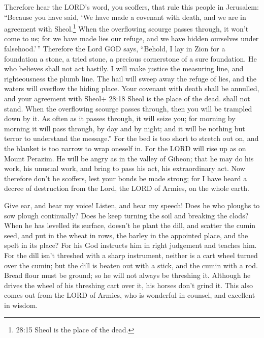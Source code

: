  Therefore hear the LORD's word, you scoffers, that rule
this people in Jerusalem:  ``Because you have said, `We
have made a covenant with death, and we are in agreement with
Sheol.\footnote{28:15 Sheol is the place of the dead.} When the
overflowing scourge passes through, it won't come to us; for we have
made lies our refuge, and we have hidden ourselves under falsehood.'\,''
 Therefore the Lord GOD says, ``Behold, I lay in Zion for a
foundation a stone, a tried stone, a precious cornerstone of a sure
foundation. He who believes shall not act hastily.  I will
make justice the measuring line, and righteousness the plumb line. The
hail will sweep away the refuge of lies, and the waters will overflow
the hiding place.  Your covenant with death shall be
annulled, and your agreement with Sheol+ 28:18 Sheol is the place of the
dead. shall not stand. When the overflowing scourge passes through, then
you will be trampled down by it.  As often as it passes
through, it will seize you; for morning by morning it will pass through,
by day and by night; and it will be nothing but terror to understand the
message.''  For the bed is too short to stretch out on, and
the blanket is too narrow to wrap oneself in.  For the LORD
will rise up as on Mount Perazim. He will be angry as in the valley of
Gibeon; that he may do his work, his unusual work, and bring to pass his
act, his extraordinary act.  Now therefore don't be
scoffers, lest your bonds be made strong; for I have heard a decree of
destruction from the Lord, the LORD of Armies, on the whole earth.

 Give ear, and hear my voice! Listen, and hear my speech!
 Does he who ploughs to sow plough continually? Does he
keep turning the soil and breaking the clods?  When he has
levelled its surface, doesn't he plant the dill, and scatter the cumin
seed, and put in the wheat in rows, the barley in the appointed place,
and the spelt in its place?  For his God instructs him in
right judgement and teaches him.  For the dill isn't
threshed with a sharp instrument, neither is a cart wheel turned over
the cumin; but the dill is beaten out with a stick, and the cumin with a
rod.  Bread flour must be ground; so he will not always be
threshing it. Although he drives the wheel of his threshing cart over
it, his horses don't grind it.  This also comes out from
the LORD of Armies, who is wonderful in counsel, and excellent in
wisdom.

